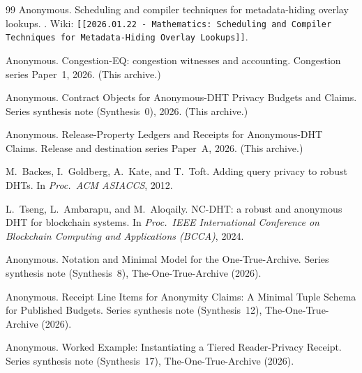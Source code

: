 \documentclass[11pt]{article}
\begin{document}
\begin{thebibliography}{99}
Anonymous.
\newblock Scheduling and compiler techniques for metadata-hiding overlay lookups.
. Wiki: \texttt{[[2026.01.22 - Mathematics: Scheduling and Compiler Techniques for Metadata-Hiding Overlay Lookups]]}.

Anonymous.
\newblock Congestion-EQ: congestion witnesses and accounting.
\newblock Congestion series Paper~1, 2026. (This archive.)

Anonymous.
\newblock Contract Objects for Anonymous-DHT Privacy Budgets and Claims.
\newblock Series synthesis note (Synthesis~0), 2026. (This archive.)

Anonymous.
\newblock Release-Property Ledgers and Receipts for Anonymous-DHT Claims.
\newblock Release and destination series Paper~A, 2026. (This archive.)

M.~Backes, I.~Goldberg, A.~Kate, and T.~Toft.
\newblock Adding query privacy to robust DHTs.
\newblock In \emph{Proc.\ ACM ASIACCS}, 2012.

L.~Tseng, L.~Ambarapu, and M.~Aloqaily.
\newblock NC-DHT: a robust and anonymous DHT for blockchain systems.
\newblock In \emph{Proc.\ IEEE International Conference on Blockchain Computing and Applications (BCCA)}, 2024.


Anonymous.
\newblock Notation and Minimal Model for the One-True-Archive.
\newblock Series synthesis note (Synthesis~8), The-One-True-Archive (2026).

Anonymous.
\newblock Receipt Line Items for Anonymity Claims: A Minimal Tuple Schema for Published Budgets.
\newblock Series synthesis note (Synthesis~12), The-One-True-Archive (2026).

Anonymous.
\newblock Worked Example: Instantiating a Tiered Reader-Privacy Receipt.
\newblock Series synthesis note (Synthesis~17), The-One-True-Archive (2026).

\end{thebibliography}
\end{document}
